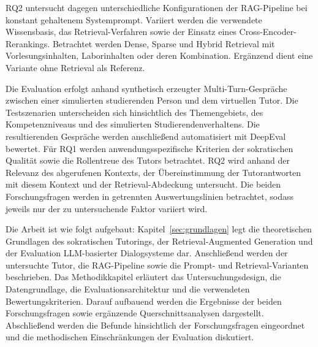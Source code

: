 RQ2 untersucht dagegen unterschiedliche Konfigurationen der RAG-Pipeline bei konstant gehaltenem Systemprompt. Variiert werden die verwendete Wissensbasis, das Retrieval-Verfahren sowie der Einsatz eines Cross-Encoder-Rerankings. Betrachtet werden Dense, Sparse und Hybrid Retrieval mit Vorlesungsinhalten, Laborinhalten oder deren Kombination. Ergänzend dient eine Variante ohne Retrieval als Referenz.
 
Die Evaluation erfolgt anhand synthetisch erzeugter Multi-Turn-Gespräche zwischen einer simulierten studierenden Person und dem virtuellen Tutor. Die Testszenarien unterscheiden sich hinsichtlich des Themengebiets, des Kompetenzniveaus und des simulierten Studierendenverhaltens. Die resultierenden Gespräche werden anschließend automatisiert mit DeepEval bewertet. Für RQ1 werden anwendungsspezifische Kriterien der sokratischen Qualität sowie die Rollentreue des Tutors betrachtet. RQ2 wird anhand der Relevanz des abgerufenen Kontexts, der Übereinstimmung der Tutorantworten mit diesem Kontext und der Retrieval-Abdeckung untersucht. Die beiden Forschungsfragen werden in getrennten Auswertungslinien betrachtet, sodass jeweils nur der zu untersuchende Faktor variiert wird.
 
Die Arbeit ist wie folgt aufgebaut: Kapitel~\ref{sec:grundlagen} legt die theoretischen Grundlagen des sokratischen Tutorings, der Retrieval-Augmented Generation und der Evaluation LLM-basierter Dialogsysteme dar. Anschließend werden der untersuchte Tutor, die RAG-Pipeline sowie die Prompt- und Retrieval-Varianten beschrieben. Das Methodikkapitel erläutert das Untersuchungsdesign, die Datengrundlage, die Evaluationsarchitektur und die verwendeten Bewertungskriterien. Darauf aufbauend werden die Ergebnisse der beiden Forschungsfragen sowie ergänzende Querschnittsanalysen dargestellt. Abschließend werden die Befunde hinsichtlich der Forschungsfragen eingeordnet und die methodischen Einschränkungen der Evaluation diskutiert.